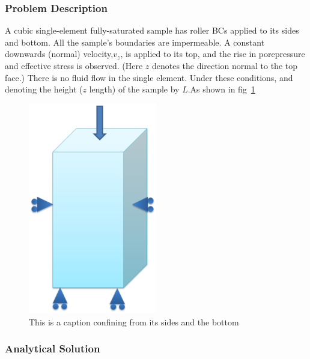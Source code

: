 \documentclass[]{scrreprt}
\begin{document}
\subsubsection{Problem Description}

A cubic single-element fully-saturated sample has roller BCs applied to its sides and bottom.  All the sample's boundaries are impermeable.  A constant downwards (normal) velocity,$v_{z}$, is applied to its top, and the rise in porepressure and effective stress is observed.  (Here $z$ denotes the direction normal to the top face.)  There is no fluid flow in the single element.
Under these conditions, and denoting the height ($z$ length) of the sample by $L$.As shown in fig~\ref{fig:Benchmark7_cubic}

\begin{figure} 
\label{fig:Benchmark7_cubic}
\centering
\includegraphics[width=0.5\textwidth]{benchmark_7_HM/elastic_model_setup}
\caption{This is a caption confining from its sides and the bottom}
\end{figure}
 
\subsubsection{Analytical Solution}
\end{document}
